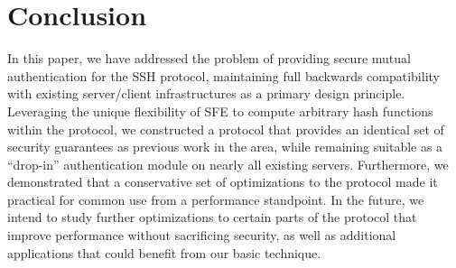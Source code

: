 \section{Conclusion}

In this paper, we have addressed the problem of providing secure
mutual authentication for the SSH protocol, maintaining full backwards
compatibility with existing server/client infrastructures as a primary
design principle. Leveraging the unique flexibility of SFE to compute
arbitrary hash functions within the protocol, we constructed a
protocol that provides an identical set of security guarantees as
previous work in the area, while remaining suitable as a ``drop-in''
authentication module on nearly all existing servers. Furthermore, we
demonstrated that a conservative set of optimizations to the protocol
made it practical for common use from a performance standpoint. In the
future, we intend to study further optimizations to certain parts of
the protocol that improve performance without sacrificing security, as
well as additional applications that could benefit from our basic
technique.
